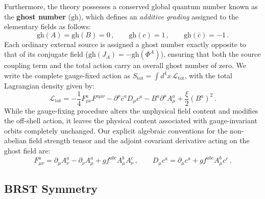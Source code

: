 Furthermore, the theory possesses a conserved global quantum number known as the \textbf{ghost number} (\(\text{gh}\)), which defines an \textit{additive grading} assigned to the elementary fields as follows:
\[
    \text{gh}(A) = \text{gh}(B) = 0 \, , \qquad \text{gh}(c) = 1 \, , \qquad \text{gh}(\bar{c}) = -1 \, .
\]
Each ordinary external source is assigned a ghost number exactly opposite to that of its conjugate field (\(\text{gh}(J_A) = -\text{gh}(\Phi^A)\)), ensuring that both the source coupling term and the total action carry an overall ghost number of zero. We write the complete gauge-fixed action as \(S_{\text{tot}} = \int d^4x \, \mathcal{L}_{\text{tot}}\), with the total Lagrangian density given by:
\begin{equation} \label{eq:ym_total_lagrangian}
    \mathcal{L}_{\text{tot}} = -\frac{1}{4} F_{\mu\nu}^a F^{a\mu\nu} - \partial^\mu \bar{c}^a D_\mu c^a - B^a \partial^\mu A_\mu^a + \frac{\xi}{2} (B^a)^2 \, .
\end{equation}
While the gauge-fixing procedure alters the unphysical field content and modifies the off-shell action, it leaves the physical content associated with gauge-invariant orbits completely unchanged. Our explicit algebraic conventions for the non-abelian field strength tensor and the adjoint covariant derivative acting on the ghost field are:
\begin{equation} \label{eq:ym_conventions}
    F_{\mu\nu}^a = \partial_\mu A_\nu^a - \partial_\nu A_\mu^a + g f^{abc} A_\mu^b A_\nu^c \, , \qquad D_\mu c^a = \partial_\mu c^a + g f^{abc} A_\mu^b c^c \, .
\end{equation}

\subsection{BRST Symmetry}

